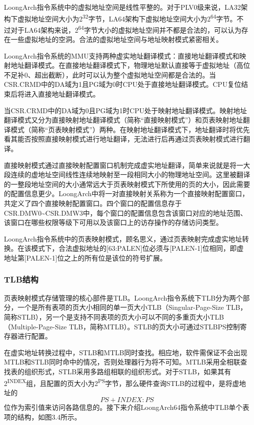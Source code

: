 \documentclass[]{ctexbook}
\begin{document}
LoongArch指令系统中的虚拟地址空间是线性平整的。对于PLV0级来说，LA32架构下虚拟地址空间大小为2\textsuperscript{32}字节，LA64架构下虚拟地址空间大小为2\textsuperscript{64}字节。不过对于LA64架构来说，2\textsuperscript{64}字节大小的虚拟地址空间并不都是合法的，可以认为存在一些虚拟地址的空洞。合法的虚拟地址空间与地址映射模式紧密相关。

LoongArch指令系统的MMU支持两种虚实地址翻译模式：直接地址翻译模式和映射地址翻译模式。在直接地址翻译模式下，物理地址默认直接等于虚拟地址（高位不足补0、超出截断），此时可以认为整个虚拟地址空间都是合法的。当CSR.CRMD中的DA域为1且PG域为0时CPU处于直接地址翻译模式。CPU复位结束后将进入直接地址翻译模式。

当CSR.CRMD中的DA域为0且PG域为1时CPU处于映射地址翻译模式。映射地址翻译模式又分为直接映射地址翻译模式（简称``直接映射模式''）和页表映射地址翻译模式（简称``页表映射模式''）两种。在映射地址翻译模式下，地址翻译时将优先看其能否按照直接映射模式进行地址翻译，无法进行后再通过页表映射模式进行翻译。

直接映射模式通过直接映射配置窗口机制完成虚实地址翻译，简单来说就是将一大段连续的虚地址空间线性连续地映射至一段相同大小的物理地址空间。这里被翻译的一整段地址空间的大小通常远大于页表映射模式下所使用的页的大小，因此需要的配置信息更少。LoongArch中将一对直接映射关系称为一个直接映射配置窗口，共定义了四个直接映射配置窗口。四个窗口的配置信息存于CSR.DMW0\textasciitilde CSR.DMW3中，每个窗口的配置信息包含该窗口对应的地址范围、该窗口在哪些权限等级下可用以及该窗口上的访存操作的存储访问类型。

LoongArch指令系统中的页表映射模式，顾名思义，通过页表映射完成虚实地址转换。在该模式下，合法虚拟地址的{[}63:PALEN{]}位必须与{[}PALEN-1{]}位相同，即虚地址第{[}PALEN-1{]}位之上的所有位是该位的符号扩展。

\hypertarget{tlbux7ed3ux6784}{%
\subsubsection{TLB结构}\label{tlbux7ed3ux6784}}

页表映射模式存储管理的核心部件是TLB。LoongArch指令系统下TLB分为两个部分，一个是所有表项的页大小相同的单一页大小TLB（Singular-Page-Size TLB，简称STLB），另一个是支持不同表项的页大小可以不同的多重页大小TLB（Multiple-Page-Size TLB，简称MTLB）。STLB的页大小可通过STLBPS控制寄存器进行配置。

在虚实地址转换过程中，STLB和MTLB同时查找。相应地，软件需保证不会出现MTLB和STLB同时命中的情况，否则处理器行为将不可知。MTLB采用全相联查找表的组织形式，STLB采用多路组相联的组织形式。对于STLB，如果其有2\textsuperscript{INDEX}组，且配置的页大小为2\textsuperscript{PS}字节，那么硬件查询STLB的过程中，是将虚地址的\[PS+INDEX:PS\]位作为索引值来访问各路信息的。接下来介绍LoongArch64指令系统中TLB单个表项的结构，如图3.4所示。
\end{document}
